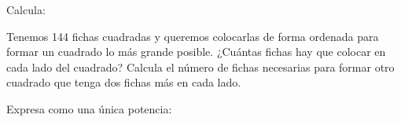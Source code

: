 \documentclass[spanish, 11pt]{exam}
\begin{document}
\begin{questions}
\begin{multicols}{2}
\end{multicols}

\question[1\half] Calcula:


\question[2] Tenemos 144 fichas cuadradas y queremos colocarlas de forma ordenada para formar un cuadrado lo más grande posible. ¿Cuántas fichas hay que colocar en cada lado del cuadrado? Calcula el número de fichas necesarias para formar otro cuadrado que tenga dos fichas más en cada lado.

\question[1\half] Expresa como una única potencia:
\begin{multicols}{3}
\end{multicols}
\end{questions}
\end{document}
